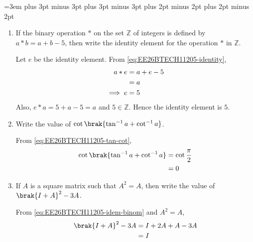 \providecommand{\rupee}{Rs.}
\emergencystretch=3em
\renewcommand{\vec}[1]{#1}
\makeatletter
\g@addto@macro\normalsize{\abovedisplayskip=10pt plus 3pt minus 3pt \belowdisplayskip=10pt plus 3pt minus 3pt \abovedisplayshortskip=6pt plus 2pt minus 2pt \belowdisplayshortskip=8pt plus 2pt minus 2pt \jot=5pt}
\makeatother
\normalsize
\begin{enumerate}[label=\thesubsection.\arabic*, ref=\thesubsection.\theenumi, itemsep=3ex]
\item
If the binary operation $*$ on the set $\mathbb{Z}$ of integers is defined by $a * b = a + b - 5$, then write the identity element for the operation $*$ in $\mathbb{Z}$.

\medskip
\solution Let $e$ be the identity element. From \eqref{eq:EE26BTECH11205-identity},
\begin{align}
	a * e &= a + e - 5 \notag
	\\
	&= a \notag
	\\
	\implies e &= 5
\end{align}
Also, $e * a = 5 + a - 5 = a$ and $5 \in \mathbb{Z}$. Hence the identity element is $5$.

\item
Write the value of $\cot\brak{\tan^{-1}a + \cot^{-1}a}$.

\medskip
\solution From \eqref{eq:EE26BTECH11205-tan-cot},
\begin{align}
	\cot\brak{\tan^{-1}a + \cot^{-1}a} &= \cot\frac{\pi}{2} \notag
	\\
	&= 0
\end{align}

\item
If $\vec{A}$ is a square matrix such that $\vec{A}^2 = \vec{A}$, then write the value of $\brak{\vec{I}+\vec{A}}^2 - 3\vec{A}$.

\medskip
\solution From \eqref{eq:EE26BTECH11205-idem-binom} and $\vec{A}^2 = \vec{A}$,
\begin{align}
	\brak{\vec{I}+\vec{A}}^2 - 3\vec{A} &= \vec{I} + 2\vec{A} + \vec{A} - 3\vec{A} \notag
	\\
	&= \vec{I}
\end{align}


\end{enumerate}
